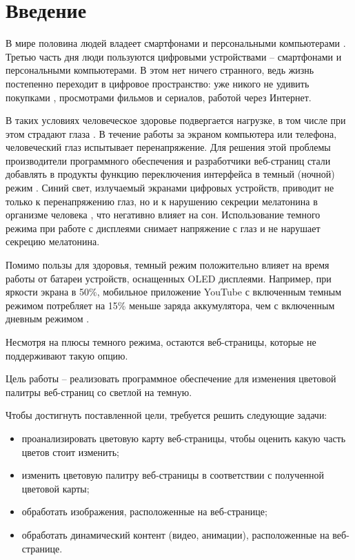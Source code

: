 \chapter*{Введение}

В мире половина людей владеет смартфонами \cite{smartphones} и персональными компьютерами \cite{pcs}. Третью часть дня \cite{digitalconsumption} люди пользуются цифровыми устройствами -- смартфонами и персональными компьютерами. В этом нет ничего странного, ведь жизнь постепенно переходит в цифровое пространство: уже никого не удивить покупками \cite{onlineshopping}, просмотрами фильмов и сериалов, работой через Интернет.

В таких условиях человеческое здоровье подвергается нагрузке, в том числе при этом страдают глаза \cite{digitaleyestrain}. В течение работы за экраном компьютера или телефона, человеческий глаз испытывает перенапряжение.  Для решения этой проблемы производители программного обеспечения и разработчики веб-страниц стали добавлять в продукты функцию переключения интерфейса в темный (ночной) режим  \cite{darkmode}. Синий свет, излучаемый экранами цифровых устройств, приводит не только к перенапряжению глаз, но и к нарушению секреции мелатонина в организме человека \cite{melatonin}, что негативно влияет на сон. Использование темного режима при работе с дисплеями снимает напряжение с глаз и не нарушает секрецию мелатонина.

Помимо пользы для здоровья, темный режим положительно влияет \cite{batterysaving} на время работы от батареи устройств, оснащенных OLED \cite{OLED} дисплеями. Например, при яркости экрана в 50\%, мобильное приложение YouTube \cite{youtube} с включенным темным режимом потребляет на 15\% меньше заряда аккумулятора, чем с включенным дневным режимом \cite{batterysaving}.

Несмотря на плюсы темного режима, остаются веб-страницы, которые не поддерживают такую опцию.

Цель работы -- реализовать программное обеспечение для изменения цветовой палитры веб-страниц со светлой на темную. 

Чтобы достигнуть поставленной цели, требуется решить следующие задачи:
\begin{itemize}
	\item проанализировать цветовую карту веб-страницы, чтобы оценить какую часть цветов стоит изменить;
	\item изменить цветовую палитру веб-страницы в соответствии с полученной цветовой карты;
	\item обработать изображения, расположенные на веб-странице;
	\item обработать динамический контент (видео, анимации), расположенные на веб-странице.
\end{itemize}

